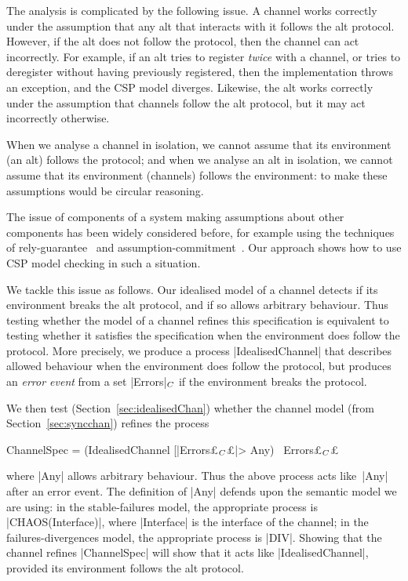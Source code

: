 The analysis is complicated by the following issue.  A channel works correctly
under the assumption that any alt that interacts with it follows the alt
protocol.  However, if the alt does not follow the protocol, then the channel
can act incorrectly.  For example, if an alt tries to register \emph{twice}
with a channel, or tries to deregister without having previously registered,
then the implementation throws an exception, and the CSP model diverges.
Likewise, the alt works correctly under the assumption that channels follow
the alt protocol, but it may act incorrectly otherwise.

When we analyse a channel in isolation, we cannot assume that its environment
(an alt) follows the protocol; and when we analyse an alt in isolation, we
cannot assume that its environment (channels) follows the environment: to make
these assumptions would be circular reasoning. 

The issue of components of a system making assumptions about other components
has been widely considered before, for example using the techniques of
rely-guarantee~\cite{jones-83} and
assumption-commitment~\cite{misra-chandy-81,PJ-91}.  Our approach shows how to
use CSP model checking in such a situation. 

We tackle this issue as follows.  Our idealised model of a channel detects if
its environment breaks the alt protocol, and if so allows arbitrary behaviour.
Thus testing whether the model of a channel refines this specification is
equivalent to testing whether it satisfies the specification when the
environment does follow the protocol.  More precisely, we produce a
process |IdealisedChannel| that describes allowed behaviour when the
environment does follow the protocol, but produces an \emph{error event} from
a set |Errors|$_C$ if the environment breaks the protocol.

We then test (Section~\ref{sec:idealisedChan}) whether the channel model (from
Section~\ref{sec:syncchan}) refines the process
%
\begin{cspm}
ChannelSpec = (IdealisedChannel [|Errors£$_C$£|> Any) \ Errors£$_C$£
\end{cspm}
%
where |Any| allows arbitrary behaviour.  Thus the above process acts
like~|Any| after an error event.  The definition of |Any| defends upon the
semantic model we are using: in the stable-failures model, the appropriate
process is |CHAOS(Interface)|, where |Interface| is the interface of the
channel; in the failures-divergences model, the appropriate process is |DIV|.
Showing that the channel refines |ChannelSpec| will show that it acts like
|IdealisedChannel|, provided its environment follows the alt protocol.

